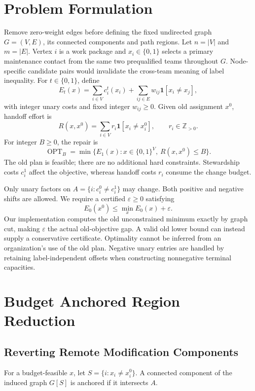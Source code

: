 \documentclass[conference]{IEEEtran}
\newcommand{\ind}{\mathbf{1}}
\newcommand{\opt}{\operatorname{OPT}}
\newcommand{\eps}{\varepsilon}
\begin{document}
\section{Problem Formulation}
Remove zero-weight edges before defining the fixed undirected graph $G=(V,E)$, its connected components and path regions. Let $n=|V|$ and $m=|E|$. Vertex $i$ is a work package and $x_i\in\{0,1\}$ selects a primary maintenance contact from the same two prequalified teams throughout $G$. Node-specific candidate pairs would invalidate the cross-team meaning of label inequality. For $t\in\{0,1\}$, define
\begin{equation}
 E_t(x)=\sum_{i\in V}c_i^t(x_i)
       +\sum_{ij\in E}w_{ij}\ind[x_i\ne x_j],\label{eq:energy}
\end{equation}
with integer unary costs and fixed integer $w_{ij}\geq0$. Given old assignment $x^0$, handoff effort is
\begin{equation}
 R(x,x^0)=\sum_{i\in V}r_i\ind[x_i\ne x_i^0],\qquad r_i\in\mathbb Z_{>0}.
\end{equation}
For integer $B\geq0$, the repair is
\begin{equation}
 \opt_B=\min\{E_1(x):x\in\{0,1\}^{V},\ R(x,x^0)\leq B\}.\label{eq:repair}
\end{equation}
The old plan is feasible; there are no additional hard constraints. Stewardship costs $c_i^1$ affect the objective, whereas handoff costs $r_i$ consume the change budget.

Only unary factors on $A=\{i:c_i^0\ne c_i^1\}$ may change. Both positive and negative shifts are allowed. We require a certified $\eps\geq0$ satisfying
\begin{equation}
 E_0(x^0)\leq\min_x E_0(x)+\eps.\label{eq:oldgap}
\end{equation}
Our implementation computes the old unconstrained minimum exactly by graph cut, making $\eps$ the actual old-objective gap. A valid old lower bound can instead supply a conservative certificate. Optimality cannot be inferred from an organization's use of the old plan. Negative unary entries are handled by retaining label-independent offsets when constructing nonnegative terminal capacities.


\section{Budget Anchored Region Reduction}
\subsection{Reverting Remote Modification Components}
For a budget-feasible $x$, let $S=\{i:x_i\ne x_i^0\}$. A connected component of the induced graph $G[S]$ is anchored if it intersects $A$.
\end{document}
